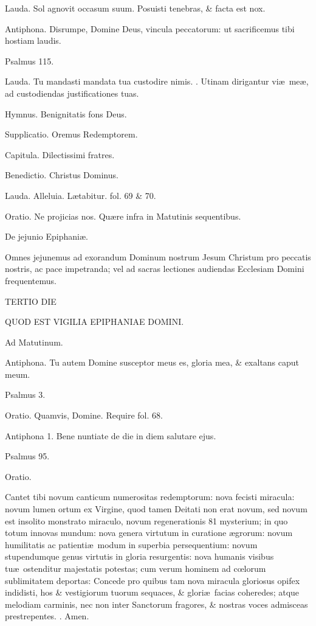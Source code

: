 \documentclass[letter,11pt]{book}
\makeatletter
\DeclareRobustCommand{\Vbar}{\vers@resp{-0.1em}{V}}
\DeclareRobustCommand{\Rbar}{\vers@resp{0pt}{R}}
\newcommand{\vers@resp@sym}{\raisebox{0.2ex}{\rotatebox[origin=c]{-20}{$\m@th\rceil$}}}
\newcommand{\vers@resp}[2]{%
  {\ooalign{\hidewidth\kern#1\vers@resp@sym\hidewidth\cr#2\cr}}%
}%
\def\V{\color{Red} \Vbar . \color{black}}
\def\R{\color{Red} \Rbar . \color{black}}
\makeatother
\begin{document}
\begin{multicols*}{2}
Lauda. Sol agnovit occasum suum. Posuisti tenebras, \& facta est nox.

Antiphona. Disrumpe, Domine Deus, vincula peccatorum: ut sacrificemus tibi hostiam laudis.

Psalmus 115.

Lauda. Tu mandasti mandata tua custodire nimis. \V Utinam dirigantur vi\ae \ me\ae , ad custodiendas justificationes tuas.

Hymnus. Benignitatis fons Deus.

Supplicatio. Oremus Redemptorem.

Capitula. Dilectissimi fratres.

Benedictio. Christus Dominus.

Lauda. Alleluia. L\ae tabitur. fol. 69 \& 70.

Oratio. Ne projicias nos. Qu\ae re infra in Matutinis sequentibus.

De jejunio Epiphani\ae .

Omnes jejunemus ad exorandum Dominum nostrum Jesum Christum pro peccatis nostris, ac pace impetranda; vel ad sacras lectiones audiendas Ecclesiam Domini frequentemus.

TERTIO DIE

QUOD EST VIGILIA EPIPHANIAE DOMINI.

Ad Matutinum.

Antiphona. Tu autem Domine susceptor meus es, gloria mea, \& exaltans caput meum.

Psalmus 3.

Oratio. Quamvis, Domine. Require fol. 68.

Antiphona 1. Bene nuntiate de die in diem salutare ejus.

Psalmus 95.

Oratio.

Cantet tibi novum canticum numerositas redemptorum: nova fecisti miracula: novum lumen ortum ex Virgine, quod tamen Deitati non erat novum, sed novum est insolito monstrato miraculo, novum regenerationis 81 mysterium; in quo totum innovas mundum: nova genera virtutum in curatione \ae grorum: novum humilitatis ac patienti\ae \ modum in superbia persequentium: novum stupendumque genus virtutis in gloria resurgentis: nova humanis visibus tu\ae \ ostenditur majestatis potestas; cum verum hominem ad c\oe lorum sublimitatem deportas: Concede pro quibus tam nova miracula gloriosus opifex indidisti, hos \& vestigiorum tuorum sequaces, \& glori\ae \ facias coheredes; atque melodiam carminis, nec non inter Sanctorum fragores, \& nostras voces admisceas prestrepentes.
\R Amen.


\end{multicols*}
\end{document}
